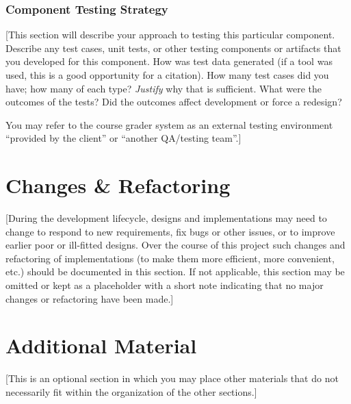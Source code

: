\documentclass[12pt]{scrartcl} %
\begin{document}
\subsubsection{Component Testing Strategy}

[This section will describe your approach to testing this particular 
component.  Describe any test cases, unit tests, or other testing 
components or artifacts that you developed for this component.  How
was test data generated (if a tool was used, this is a good opportunity
for a citation).  How many test cases did you have; how many of each type?  
\emph{Justify} why that is sufficient.  What were the outcomes of the tests?
Did the outcomes affect development or force a redesign?

You may refer to the course grader system as an external testing 
environment ``provided by the client'' or ``another QA/testing team''.]

\section{Changes \& Refactoring}

[During the development lifecycle, designs and implementations may need 
to change to respond to new   requirements, fix bugs or other issues, or 
to improve earlier poor or ill-fitted designs.  Over the course of this 
project such changes and refactoring of implementations (to make them 
more efficient, more convenient, etc.) should be documented in this 
section.  If not applicable, this section may be omitted or kept as a 
placeholder with a short note indicating that no major changes or 
refactoring have been made.]

\section{Additional Material}

[This is an optional section in which you may place other materials that do not necessarily fit within the organization of the other sections.]

\nocite{*}

%

\end{document}

